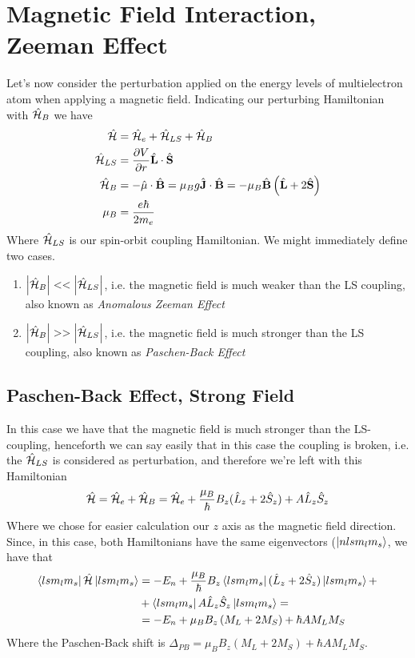 \documentclass[../qm.tex]{subfiles}
\begin{document}
	\section{Magnetic Field Interaction, Zeeman Effect}
	Let's now consider the perturbation applied on the energy levels of multielectron atom when applying a magnetic field. Indicating our perturbing Hamiltonian with $\hat{\mathcal{H}}_B$ we have
	\begin{equation}
		\begin{aligned}
			\hat{\mathcal{H}}&=\hat{\mathcal{H}}_e+\hat{\mathcal{H}}_{LS}+\hat{\mathcal{H}}_B\\
			\hat{\mathcal{H}}_{LS}&=\pdv{V}{r}\hat{\mathbf{L}}\cdot\hat{\mathbf{S}}\\
			\hat{\mathcal{H}}_{B}&=-\hat{\mathbf{\mu}}\cdot\hat{\mathbf{B}}=\mu_Bg\hat{\mathbf{J}}\cdot\hat{\mathbf{B}}=-\mu_B\hat{\mathbf{B}}\left( \hat{\mathbf{L}}+2\hat{\mathbf{S}} \right)\\
			\mu_B&=\frac{e\hbar}{2m_e}
		\end{aligned}
		\label{eq:totalzeemanhammultielec}
	\end{equation}
	Where $\hat{\mathcal{H}}_{LS}$ is our spin-orbit coupling Hamiltonian. We might immediately define two cases.
	\begin{enumerate}
	\item $\abs{\hat{\mathcal{H}}_B}<<\abs{\hat{\mathcal{H}}_{LS}}$, i.e. the magnetic field is much weaker than the LS coupling, also known as \textit{Anomalous Zeeman Effect}
	\item $\abs{\hat{\mathcal{H}}_B}>>\abs{\hat{\mathcal{H}}_{LS}}$, i.e. the magnetic field is much stronger than the LS coupling, also known as \textit{Paschen-Back Effect}
	\end{enumerate}
	\subsection{Paschen-Back Effect, Strong Field}
	In this case we have that the magnetic field is much stronger than the LS-coupling, henceforth we can say easily that in this case the coupling is broken, i.e. the $\hat{\mathcal{H}}_{LS}$ is considered as perturbation, and therefore we're left with this Hamiltonian
	\begin{equation}
		\hat{\mathcal{H}}=\hat{\mathcal{H}}_e+\hat{\mathcal{H}}_B=\hat{\mathcal{H}}_e+\frac{\mu_B}{\hbar}B_z(\hat{L}_z+2\hat{S}_z)+A\hat{L}_z\hat{S}_z
		\label{eq:paschenbackmultielec}
	\end{equation}
	Where we chose for easier calculation our $z$ axis as the magnetic field direction. Since, in this case, both Hamiltonians have the same eigenvectors ($\ket{nlsm_lm_s}$, we have that
	\begin{equation}
		\begin{aligned}
			\bra{lsm_lm_s}\hat{\mathcal{H}}\ket{lsm_lm_s}&=-E_n+\frac{\mu_B}{\hbar}B_z\bra{lsm_lm_s}(\hat{L}_z+2\hat{S}_z)\ket{lsm_lm_s}+\\
			&+\bra{lsm_lm_s}A\hat{L}_z\hat{S}_z\ket{lsm_lm_s}=\\
			&=-E_n+\mu_BB_z\left( M_L+2M_S \right)+\hbar AM_LM_S
		\end{aligned}
		\label{eq:shiftpaschenback}
	\end{equation}
	Where the Paschen-Back shift is $\Delta_{PB}=\mu_BB_z(M_L+2M_S)+\hbar AM_LM_S$.\\
\end{document}
